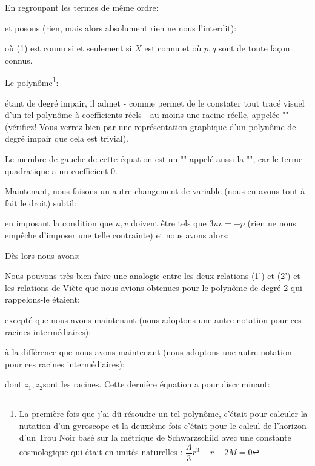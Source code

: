 	En regroupant les termes de même ordre:
	
	et posons (rien, mais alors absolument rien ne nous l'interdit):
	
	où (1) est connu si et seulement si $X$ est connu et où $p, q$ sont de toute façon connus.

	Le polynôme\footnote{La première fois que j'ai dû résoudre un tel polynôme, c'était pour calculer la nutation d'un gyroscope et la deuxième fois c'était pour le calcul de l'horizon d'un Trou Noir basé sur la métrique de Schwarzschild avec une constante cosmologique qui était en unités naturelles : $\dfrac{\Lambda}{3}r^3-r-2M=0$}:
	
	étant de degré impair, il admet - comme permet de le constater tout tracé visuel d'un tel polynôme à coefficients réels - au moins une racine réelle, appelée "" (vérifiez! Vous verrez bien par une représentation graphique d'un polynôme de degré impair que cela est trivial).
	
	Le membre de gauche de cette équation est un "" appelé aussi la "", car le terme quadratique a un coefficient $0$.
	
	Maintenant, nous faisons un autre changement de variable (nous en avons tout à fait le droit) subtil: 
	
	en imposant la condition que $u,v$ doivent être tels que $3uv=-p$ (rien ne nous empêche d'imposer une telle contrainte) et nous avons alors:
	
	Dès lors nous avons:
	
	Nous pouvons très bien faire une analogie entre les deux relations (1') et (2') et les relations de Viète que nous avions obtenues pour le polynôme de degré 2 qui rappelons-le étaient:
	
	excepté que nous avons maintenant (nous adoptons une autre notation pour ces racines intermédiaires):
	
	à la différence que nous avons maintenant (nous adoptons une autre notation pour ces racines intermédiaires): 
	
	dont $z_1,z_2$sont les racines.
	Cette dernière équation a pour discriminant:
	
